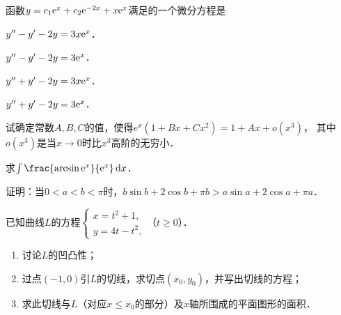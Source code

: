 \documentclass[plain,noanswer,medmath]{../../template/jnuexam}
\begin{document}
\begin{problem}
函数$y = c_1\mathrm{e}^x + c_2\mathrm{e}^{- 2x} + x\mathrm{e}^x$满足的一个微分方程是\pickout{}
\begin{abcd}
\item $y'' - y' - 2y = 3x\mathrm{e}^x$．
\item $y'' - y' - 2y = 3\mathrm{e}^x$．
\item $y'' + y' - 2y = 3x\mathrm{e}^x$．
\item $y'' + y' - 2y = 3\mathrm{e}^x$．
\end{abcd}
\end{problem}












\begin{problem}[points=10]
试确定常数$A,B,C$的值，使得$e^x(1 + Bx + Cx^2) = 1 + Ax + o(x^3)$，
其中$o(x^3)$是当$x \to 0$时比$x^3$高阶的无穷小．
\end{problem}


\begin{problem}[points=10]
求$\int \frac{\arcsin \e^x}{\e^x}\dx$．
\end{problem}






\begin{problem}[points=10]
证明：当$0 < a < b < \pi$时，$b\sin b + 2\cos b + \pi b > a\sin a + 2\cos a + \pi a$．
\end{problem}




\begin{problem}[points=12]
已知曲线$L$的方程$\begin{cases}
  x = t^2 + 1, \\
  y = 4t - t^2,
\end{cases}$（$t \ge 0$）．
\begin{enumerate}
\item 讨论$L$的凹凸性；
\item 过点$(-1,0)$引$L$的切线，求切点$(x_0,y_0)$，并写出切线的方程；
\item 求此切线与$L$（对应$x \le x_0$的部分）及$x$轴所围成的平面图形的面积．
\end{enumerate}
\end{problem}




\end{document}
